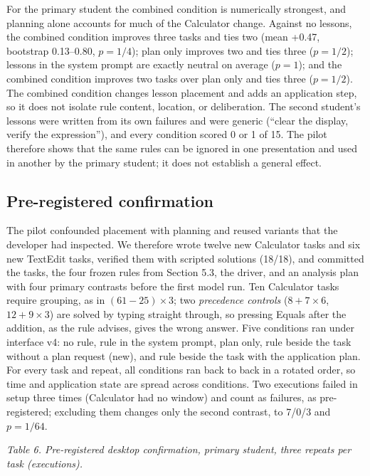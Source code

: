 \documentclass[
  10pt,
]{article}
\begin{document}
For the primary student the combined condition is numerically strongest,
and planning alone accounts for much of the Calculator change. Against
no lessons, the combined condition improves three tasks and ties two
(mean +0.47, bootstrap 0.13--0.80, \(p=1/4\)); plan only improves two
and ties three (\(p=1/2\)); lessons in the system prompt are exactly
neutral on average (\(p=1\)); and the combined condition improves two
tasks over plan only and ties three (\(p=1/2\)). The combined condition
changes lesson placement and adds an application step, so it does not
isolate rule content, location, or deliberation. The second student's
lessons were written from its own failures and were generic (``clear the
display, verify the expression''), and every condition scored 0 or 1 of
15. The pilot therefore shows that the same rules can be ignored in one
presentation and used in another by the primary student; it does not
establish a general effect.

\subsection{Pre-registered
confirmation}\label{pre-registered-confirmation}

The pilot confounded placement with planning and reused variants that
the developer had inspected. We therefore wrote twelve new Calculator
tasks and six new TextEdit tasks, verified them with scripted solutions
(18/18), and committed the tasks, the four frozen rules from Section
5.3, the driver, and an analysis plan with four primary contrasts before
the first model run. Ten Calculator tasks require grouping, as in
\((61-25)\times 3\); two \emph{precedence controls} (\(8+7\times 6\),
\(12+9\times 3\)) are solved by typing straight through, so pressing
Equals after the addition, as the rule advises, gives the wrong answer.
Five conditions ran under interface v4: no rule, rule in the system
prompt, plan only, rule beside the task without a plan request (new),
and rule beside the task with the application plan. For every task and
repeat, all conditions ran back to back in a rotated order, so time and
application state are spread across conditions. Two executions failed in
setup three times (Calculator had no window) and count as failures, as
pre-registered; excluding them changes only the second contrast, to
7/0/3 and \(p=1/64\).

\emph{Table 6. Pre-registered desktop confirmation, primary student,
three repeats per task (executions).}
\end{document}
